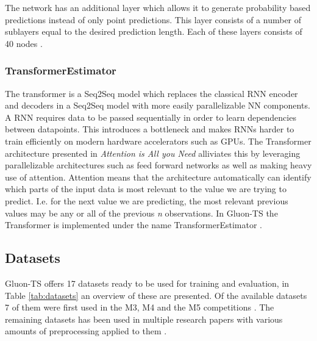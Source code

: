 The network has an additional layer which allows it to generate probability based predictions instead of only point predictions. This layer consists of a number of sublayers equal to the desired prediction length. Each of these layers consists of 40 nodes \cite{gluonts-github}.

\subsubsection{TransformerEstimator}
The transformer is a Seq2Seq model which replaces the classical RNN encoder and decoders in a Seq2Seq model with more easily parallelizable NN components. A RNN requires data to be passed sequentially in order to learn dependencies between datapoints. This introduces a bottleneck and makes RNNs harder to train efficiently on modern hardware accelerators such as GPUs. The Transformer architecture presented in \textit{Attention is All you Need} \cite{vaswani_attention_nodate} alliviates this by leveraging parallelizable architectures such as feed forward networks as well as making heavy use of attention. Attention means that the architecture automatically can identify which parts of the input data is most relevant to the value we are trying to predict\cite{vaswani_attention_nodate}. I.e. for the next value we are predicting, the most relevant previous values may be any or all of the previous \textit{n} observations.  In Gluon-TS the Transformer is implemented under the name TransformerEstimator \cite{gluonts-website}.

\subsection{Datasets}
Gluon-TS offers 17 datasets ready to be used for training and evaluation, in Table \ref{tab:datasets} an overview of these are presented. Of the available datasets 7 of them were first used in the M3, M4 and the M5 competitions \cite{makridakis_m4_2020,m3_competition,m5}. The remaining datasets has been used in multiple research papers with various amounts of preprocessing applied to them \cite{oreshkin_n_beats_2020,lai_modeling_2018,rangapuram_deep_2018,wen_multi-horizon_2018,wang_deep_2019,seq2seq}.

